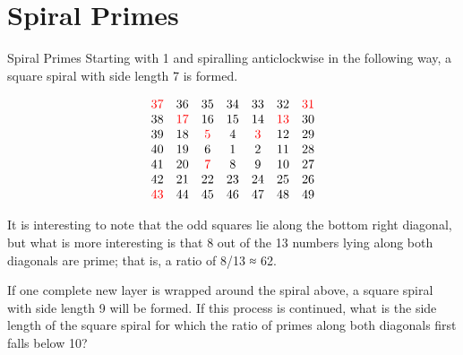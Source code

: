 \chapter{Spiral Primes}
Spiral Primes
Starting with 1 and spiralling anticlockwise in the following way, a square spiral with side length 7 is formed.
\begin{center}
	\[
		\begin{matrix}
			{\textcolor{red}{37}} & 36                  & 35                 & 34 & 33                 & 32                  & \textcolor{red}{31} \\
			38                    & \textcolor{red}{17} & 16                 & 15 & 14                 & \textcolor{red}{13} & 30                  \\
			39                    & 18                  & \textcolor{red}{5} & 4  & \textcolor{red}{3} & 12                  & 29                  \\
			40                    & 19                  & 6                  & 1  & 2                  & 11                  & 28                  \\
			41                    & 20                  & \textcolor{red}{7} & 8  & 9                  & 10                  & 27                  \\
			42                    & 21                  & 22                 & 23 & 24                 & 25                  & 26                  \\
			\textcolor{red}{43}   & 44                  & 45                 & 46 & 47                 & 48                  & 49                  \\
		\end{matrix}
	\]
\end{center}
It is interesting to note that the odd squares lie along the bottom right diagonal, but what is more interesting is that
8 out of the 13 numbers lying along both diagonals are prime; that is, a ratio of 8/13 ≈ 62.

If one complete new layer is wrapped around the spiral above, a square spiral with side length 9 will be formed. If this
process is continued, what is the side length of the square spiral for which the ratio of primes along both diagonals
first falls below 10?
